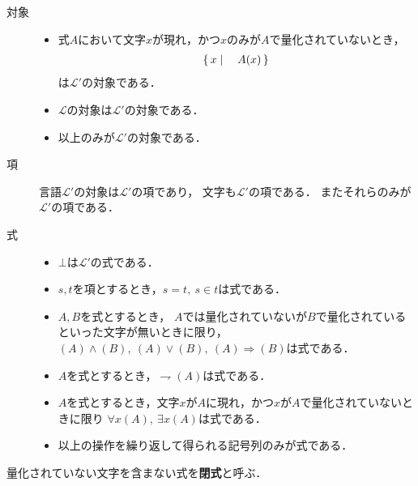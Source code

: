 	\begin{description}
		\item[対象]
			\begin{itemize}
				\item 式$A$において文字$x$が現れ，かつ$x$のみが$A$で量化されていないとき，
					\begin{align}
						\left\{\, x \mid \quad A(x)\, \right\}
					\end{align}
					は$\mathcal{L}'$の対象である．
					
				\item $\mathcal{L}$の対象は$\mathcal{L}'$の対象である．
				
				\item 以上のみが$\mathcal{L}'$の対象である．
			\end{itemize}
			
		\item[項] 言語$\mathcal{L}'$の対象は$\mathcal{L}'$の項であり，
			文字も$\mathcal{L}'$の項である．
			またそれらのみが$\mathcal{L}'$の項である．
	
		\item[式] 
			\begin{itemize}
				\item $\bot$は$\mathcal{L}'$の式である．
				
				\item $s,t$を項とするとき，$s=t,\ s \in t$は式である．
					
				\item $A,B$を式とするとき，
					$A$では量化されていないが$B$で量化されているといった文字が無いときに限り，
					$(A) \wedge (B),\ (A) \vee (B),\ (A)\Longrightarrow (B)$は式である．
				
				\item $A$を式とするとき，$\rightharpoondown (A)$は式である．
				
				\item $A$を式とするとき，文字$x$が$A$に現れ，かつ$x$が$A$で量化されていないときに限り
					$\forall x (A),\ \exists x (A)$は式である．
				
				\item 以上の操作を繰り返して得られる記号列のみが式である．
			\end{itemize}
	\end{description}
	
	\begin{screen}
		\begin{dfn}[閉式]
			量化されていない文字を含まない式を{\bf 閉式}と呼ぶ．
		\end{dfn}
	\end{screen}
	
